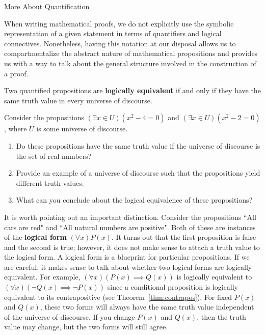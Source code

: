 \begin{section}{More About Quantification}

When writing mathematical proofs, we do not explicitly use the symbolic representation of a given statement in terms of quantifiers and logical connectives.  Nonetheless, having this notation at our disposal allows us to compartmentalize the abstract nature of mathematical propositions and provides us with a way to talk about the general structure involved in the construction of a proof.

\begin{definition}
Two quantified propositions are \textbf{logically equivalent} if and only if they have the same truth value in every universe of discourse.
\end{definition}

\begin{problem}
Consider the propositions $(\exists x\in U)(x^2-4=0)$ and $(\exists x\in U)(x^2-2=0)$, where $U$ is some universe of discourse.  
\begin{enumerate}[label=\textrm{(\alph*)}]
\item Do these propositions have the same truth value if the universe of discourse is the set of real numbers?
\item Provide an example of a universe of discourse such that the propositions yield different truth values.  
\item What can you conclude about the logical equivalence of these propositions?
\end{enumerate}
\end{problem}

It is worth pointing out an important distinction.  Consider the propositions ``All cars are red" and ``All natural numbers are positive".  Both of these are instances of the \textbf{logical form} $(\forall x)P(x)$.  It turns out that the first proposition is false and the second is true; however, it does not make sense to attach a truth value to the logical form.  A logical form is a blueprint for particular propositions.  If we are careful, it makes sense to talk about whether two logical forms are logically equivalent.  For example, $(\forall x)(P(x)\implies Q(x))$ is logically equivalent to $(\forall x)(\neg Q(x)\implies \neg P(x))$ since a conditional proposition is logically equivalent to its contrapositive (see Theorem~\ref{thm:contrapos}).  For fixed $P(x)$ and $Q(x)$, these two forms will always have the same truth value independent of the universe of discourse.  If you change $P(x)$ and $Q(x)$, then the truth value may change, but the two forms will still agree.


\end{section}
